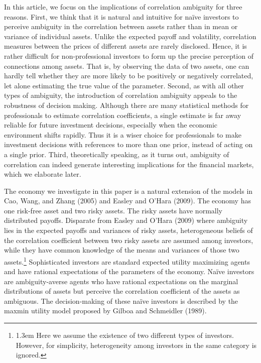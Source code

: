 \documentclass[10pt]{article}
\begin{document}
In this article, we focus on the implications of correlation ambiguity for three reasons. First, we think that it is natural and intuitive for na\"ive investors to perceive ambiguity in the correlation between assets rather than in mean or variance of individual assets. Unlike the expected payoff and volatility, correlation measures between the prices of different assets are rarely disclosed. Hence, it is rather difficult for non-professional investors to form up the precise perception of connections among assets. That is, by observing the data of two assets, one can hardly tell whether they are more likely to be positively or negatively correlated, let alone estimating the true value of the parameter. Second, as with all other types of ambiguity, the introduction of correlation ambiguity appeals to the robustness of decision making. Although there are many statistical methods for professionals to estimate correlation coefficients, a single estimate is far away reliable for future investment decisions, especially when the economic environment shifts rapidly. Thus it is a wiser choice for professionals to make investment decisions with references to more than one prior, instead of acting on a single prior. Third, theoretically speaking, as it turns out, ambiguity of correlation can indeed generate interesting implications for the financial markets, which we elaborate later.

The economy we investigate in this paper is a natural extension of the models in Cao, Wang, and Zhang (2005) and Easley and O'Hara (2009). The economy has one risk-free asset and two risky assets. The risky assets have normally distributed payoffs. Disparate from Easley and O'Hara (2009) where ambiguity lies in the expected payoffs and variances of risky assets, heterogeneous beliefs of the correlation coefficient between two risky assets are assumed among investors, while they have common knowledge of the means and variances of those two assets.\footnote{\baselineskip1.3em Here we assume the existence of two different types of investors. However, for simplicity, heterogeneity among investors in the same category is ignored.} Sophisticated investors are standard expected utility maximizing agents and have rational expectations of the parameters of the economy. Na\"ive investors are ambiguity-averse agents who have rational expectations on the marginal distributions of assets but perceive the correlation coefficient of the assets as ambiguous. The decision-making of these na\"ive investors is described by the maxmin utility model proposed by Gilboa and Schmeidler (1989).
\end{document}
